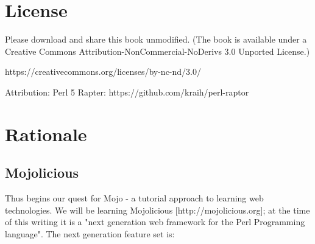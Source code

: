 \documentclass[14pt]{extreport}
\begin{document}

\setcounter{page}{2}
\tableofcontents


\chapter*{License}

Please download and share this book unmodified. (The book is available under a
Creative Commons Attribution-NonCommercial-NoDerivs 3.0 Unported License.)

https://creativecommons.org/licenses/by-nc-nd/3.0/

Attribution:
Perl 5 Rapter: https://github.com/kraih/perl-raptor

\chapter*{Rationale}

\section{Mojolicious}

Thus begins our quest for Mojo - a tutorial approach to learning web
technologies. We will be learning Mojolicious [http://mojolicious.org]; at the
time of this writing it is a "next generation web framework for the Perl
Programming language".  The next generation feature set is:
\end{document}
